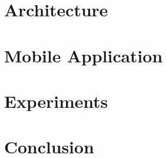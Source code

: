 \documentclass[english, a4paper, 11pt, twoside]{article}
\numberwithin{equation}{section} %
\begin{document}
\section{Architecture}
    
\clearpage

\section{Mobile Application}
    
\clearpage
  
\section{Experiments}
    
\clearpage

\section{Conclusion}
    
\clearpage

\newpage
\renewcommand{\bibsection}{References}
{ %
}
\end{document}
